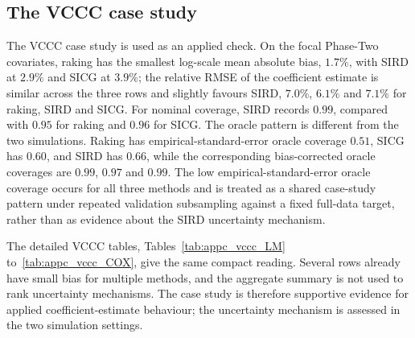 \subsection{The VCCC case study}
\label{sec:sird_sim_vccc}

The VCCC case study is used as an applied check. On the focal Phase-Two covariates, raking has the smallest log-scale mean absolute bias, \(1.7\%\), with SIRD at \(2.9\%\) and SICG at \(3.9\%\); the relative RMSE of the coefficient estimate is similar across the three rows and slightly favours SIRD, \(7.0\%\), \(6.1\%\) and \(7.1\%\) for raking, SIRD and SICG. For nominal coverage, SIRD records \(0.99\), compared with \(0.95\) for raking and \(0.96\) for SICG. The oracle pattern is different from the two simulations. Raking has empirical-standard-error oracle coverage \(0.51\), SICG has \(0.60\), and SIRD has \(0.66\), while the corresponding bias-corrected oracle coverages are \(0.99\), \(0.97\) and \(0.99\). The low empirical-standard-error oracle coverage occurs for all three methods and is treated as a shared case-study pattern under repeated validation subsampling against a fixed full-data target, rather than as evidence about the SIRD uncertainty mechanism.

The detailed VCCC tables, Tables~\ref{tab:appc_vccc_LM} to~\ref{tab:appc_vccc_COX}, give the same compact reading. Several rows already have small bias for multiple methods, and the aggregate summary is not used to rank uncertainty mechanisms. The case study is therefore supportive evidence for applied coefficient-estimate behaviour; the uncertainty mechanism is assessed in the two simulation settings.

